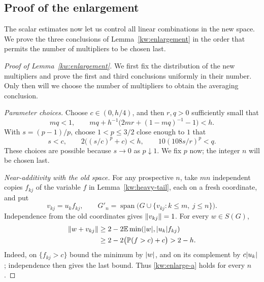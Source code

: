 \subsection{Proof of the enlargement}

The scalar estimates now let us control all linear combinations in the
new space.  We prove the three conclusions of Lemma~\ref{kw:enlargement}
in the order that permits the number of multipliers to be chosen last.

\begin{proof}[Proof of Lemma~\ref{kw:enlargement}]
We first fix the distribution of the new multipliers and prove the first
and third conclusions uniformly in their number.  Only then will we
choose the number of multipliers to obtain the averaging conclusion.

\emph{Parameter choices.}
Choose $c\in(0,h/4)$, and then $r,q>0$ sufficiently small that
\begin{equation}\label{kw:rq-choice}
 mq<1,\qquad
 mq+h^{-1}\bigl(2mr+(1-mq)^{-1}-1\bigr)<h.
\end{equation}
With $s=(p-1)/p$, choose $1<p\le3/2$ close enough to $1$ that
\begin{equation}\label{kw:p-choice}
 s<c,\qquad 2\bigl((s/c)^p+c\bigr)<h,
 \qquad 10(108s/r)^p<q.
\end{equation}
These choices are possible because $s\to0$ as $p\downarrow1$.
We fix $p$ now; the integer $n$ will be chosen last.

\emph{Near-additivity with the old space.}
For any prospective $n$, take $mn$ independent copies $f_{kj}$ of the
variable $f$ in Lemma~\ref{kw:heavy-tail}, each on a fresh coordinate,
and put
\[
 v_{kj}=u_kf_{kj},\qquad
 G'_n=\operatorname{span}\bigl(G\cup\{v_{kj}:k\le m,\ j\le n\}\bigr).
\]
Independence from the old coordinates gives $\lVert v_{kj}\rVert=1$.
For every $w\in S(G)$,
\begin{align*}
 \lVert w+v_{kj}\rVert
 &\ge2-2\mathbb E\min(\lvert w\rvert,\lvert u_k\rvert f_{kj})\\
 &\ge2-2\bigl(\mathbb P(f>c)+c\bigr)>2-h.
\end{align*}
Indeed, on $\{f_{kj}>c\}$ bound the minimum by $\lvert w\rvert$, and on its
complement by $c\lvert u_k\rvert$; independence then gives the last bound.
Thus \eqref{kw:enlarge-a} holds for every $n$.


\end{proof}
